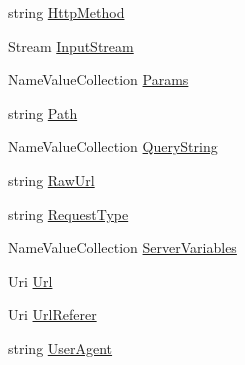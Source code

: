 \begin{DoxyCompactItemize}
\item 
string \hyperlink{class_p_http_1_1_http_request_a1a06fe319218e91f87d8634e9f1fd161}{Http\+Method}
\item 
Stream \hyperlink{class_p_http_1_1_http_request_a28bfe86de1844f0acc52a508beff7a0d}{Input\+Stream}
\item 
Name\+Value\+Collection \hyperlink{class_p_http_1_1_http_request_afe720fe3b7df60512206e3489646f4ea}{Params}
\item 
string \hyperlink{class_p_http_1_1_http_request_aa1afab39a1a67a1bf6b21c0fe98f1b1a}{Path}
\item 
Name\+Value\+Collection \hyperlink{class_p_http_1_1_http_request_aa450d8f39a88267f9834438536109141}{Query\+String}
\item 
string \hyperlink{class_p_http_1_1_http_request_a110fda1516b526042358ece19ae0d3b2}{Raw\+Url}
\item 
string \hyperlink{class_p_http_1_1_http_request_ad357eb0b08d65525bda114e56d5c0845}{Request\+Type}
\item 
Name\+Value\+Collection \hyperlink{class_p_http_1_1_http_request_aeb783c64b73304cd0652bceccce4f977}{Server\+Variables}
\item 
Uri \hyperlink{class_p_http_1_1_http_request_a80695524bcd7191160e1336d3dd3228b}{Url}
\item 
Uri \hyperlink{class_p_http_1_1_http_request_a57857c2fb97aa5b73e6dcd8a9cfc08b0}{Url\+Referer}
\item 
string \hyperlink{class_p_http_1_1_http_request_a488ec402e516339eac28b9b3b7b15bd1}{User\+Agent}
\item 

\end{DoxyCompactItemize}
